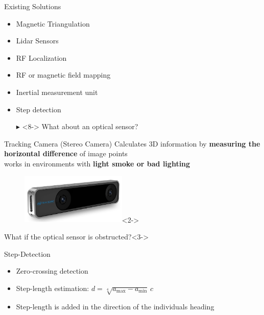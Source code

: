 \documentclass[aspectratio=169,handout]{beamer}
\begin{document}
{	\begin{frame}{Existing Solutions}
		\begin{itemize}
			\item<2-> Magnetic Triangulation %
			\item<3-> Lidar Sensors %
			\item<4-> RF Localization 
			\item<5-> RF or magnetic field mapping%
			\item<6-> Inertial measurement unit %
			\item<7-> Step detection %
			\item[$\blacktriangleright$]<8-> What about an optical sensor?
		\end{itemize}
	\end{frame}
	
	
	\begin{frame}{Tracking Camera (Stereo Camera)}
		 Calculates 3D information by \textbf{measuring the horizontal difference} of image points\\
		 works in environments with \textbf{light smoke or bad lighting}
	
		
		
		\begin{figure}
			\centering
			\includegraphics[width=0.45\textwidth]{realsense.jpg}<2->
		\end{figure}
		
			\begin{block}{What if the optical sensor is obstructed?}<3->
		\end{block}
	\end{frame}
	
	
	\begin{frame}{Step-Detection}
		\begin{itemize}
			\item<2-> Zero-crossing detection 
			\item<3-> Step-length estimation: $d = \sqrt[4]{a_{\max}-a_{\min}}  \, c$
			\item<4-> Step-length is added in the direction of the individuals heading
		\end{itemize}
		

\end{frame}}
\end{document}
